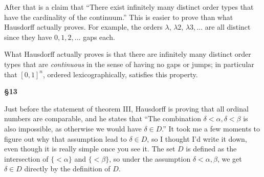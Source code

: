 \documentclass[11pt]{amsart}
\begin{document}
After that is a claim that ``There exist infinitely many distinct order types
that have the cardinality of the continuum.''
This is easier to prove than what Hausdorff actually proves. For example,
the orders $\lambda$, $\lambda 2$, $\lambda 3, \ldots$ are all distinct since
they have $0, 1, 2, \dots$ gaps each.

What Hausdorff actually proves is that there are infinitely many distinct
order types that are {\em continuous} in the sense of having no gaps or jumps;
in particular that $[0,1]^n$, ordered lexicographically, satisfies this property.


{\bf \S 13}

Just before the statement of theorem III, Hausdorff is proving that all ordinal numbers are comparable,
and he states that ``The combination $\delta < \alpha, \delta < \beta$ is
also impossible, as otherwise we would have $\delta \in D$.''
It took me a few moments to figure out why that assumption lead to
$\delta\in D$, so I thought I'd write it down, even though it is really simple
once you see it. The set $D$ is defined as the intersection of $\{<\alpha\}$
and $\{<\beta\}$, so under the assumption $\delta < \alpha, \beta$, we
get $\delta\in D$ directly by the definition of $D$.
\end{document}
